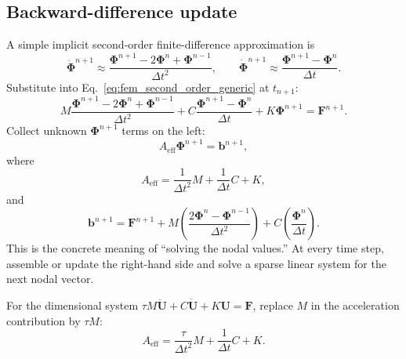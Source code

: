 \documentclass[11pt]{article}
\begin{document}
\subsection{Backward-difference update}
A simple implicit second-order finite-difference approximation is
\begin{equation}
    \ddot{\bm{\Phi}}^{n+1}\approx
    \frac{\bm{\Phi}^{n+1}-2\bm{\Phi}^{n}+\bm{\Phi}^{n-1}}{\Delta t^2},
    \qquad
    \dot{\bm{\Phi}}^{n+1}\approx
    \frac{\bm{\Phi}^{n+1}-\bm{\Phi}^{n}}{\Delta t}.
\end{equation}
Substitute into Eq.~\eqref{eq:fem_second_order_generic} at \(t_{n+1}\):
\begin{equation}
    M\frac{\bm{\Phi}^{n+1}-2\bm{\Phi}^{n}+\bm{\Phi}^{n-1}}{\Delta t^2}
    +C\frac{\bm{\Phi}^{n+1}-\bm{\Phi}^{n}}{\Delta t}
    +K\bm{\Phi}^{n+1}
    =\bm{F}^{n+1}.
\end{equation}
Collect unknown \(\bm{\Phi}^{n+1}\) terms on the left:
\begin{equation}
    \boxed{
    A_{\mathrm{eff}}\bm{\Phi}^{n+1}=\bm{b}^{n+1},}
    \label{eq:effective_solve}
\end{equation}
where
\begin{equation}
    \boxed{
    A_{\mathrm{eff}}=\frac{1}{\Delta t^2}M+\frac{1}{\Delta t}C+K,}
    \label{eq:aeff_bdf}
\end{equation}
and
\begin{equation}
    \boxed{
    \bm{b}^{n+1}=\bm{F}^{n+1}
    +M\left(\frac{2\bm{\Phi}^{n}-\bm{\Phi}^{n-1}}{\Delta t^2}\right)
    +C\left(\frac{\bm{\Phi}^{n}}{\Delta t}\right).}
    \label{eq:rhs_bdf}
\end{equation}
This is the concrete meaning of ``solving the nodal values.'' At every time step, assemble or update the right-hand side and solve a sparse linear system for the next nodal vector.

For the dimensional system \(\tau M\ddot{\bm{U}}+C\dot{\bm{U}}+K\bm{U}=\bm{F}\), replace \(M\) in the acceleration contribution by \(\tau M\):
\begin{equation}
    A_{\mathrm{eff}}=\frac{\tau}{\Delta t^2}M+\frac{1}{\Delta t}C+K.
\end{equation}
\end{document}
